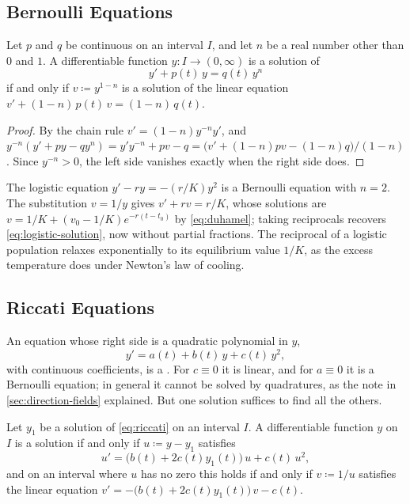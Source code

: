 \subsection{Bernoulli Equations}

\begin{proposition}
\label{prop:bernoulli}
Let $p$ and $q$ be continuous on an interval $I$, and let $n$ be a real number other than $0$ and $1$. A differentiable function $y\colon I\to(0,\infty)$ is a solution of
\[
y'+p(t)\,y=q(t)\,y^n
\]
if and only if $v\coloneqq y^{1-n}$ is a solution of the linear equation $v'+(1-n)\,p(t)\,v=(1-n)\,q(t)$.
\end{proposition}

\begin{proof}
By the chain rule $v'=(1-n)y^{-n}y'$, and $y^{-n}(y'+py-qy^n)=y'y^{-n}+pv-q=\bigl(v'+(1-n)pv-(1-n)q\bigr)/(1-n)$. Since $y^{-n}>0$, the left side vanishes exactly when the right side does.
\end{proof}

The logistic equation $y'-ry=-(r/K)y^2$ is a Bernoulli equation with $n=2$. The substitution $v=1/y$ gives $v'+rv=r/K$, whose solutions are $v=1/K+(v_0-1/K)e^{-r(t-t_0)}$ by \eqref{eq:duhamel}; taking reciprocals recovers \eqref{eq:logistic-solution}, now without partial fractions. The reciprocal of a logistic population relaxes exponentially to its equilibrium value $1/K$, as the excess temperature does under Newton's law of cooling.

\subsection{Riccati Equations}

An equation whose right side is a quadratic polynomial in $y$,
\begin{equation}
y'=a(t)+b(t)\,y+c(t)\,y^2 ,
\label{eq:riccati}
\end{equation}
with continuous coefficients, is a . For $c\equiv0$ it is linear, and for $a\equiv0$ it is a Bernoulli equation; in general it cannot be solved by quadratures, as the note in \cref{sec:direction-fields} explained. But one solution suffices to find all the others.

\begin{proposition}
\label{prop:riccati}
Let $y_1$ be a solution of \eqref{eq:riccati} on an interval $I$. A differentiable function $y$ on $I$ is a solution if and only if $u\coloneqq y-y_1$ satisfies
\[
u'=\bigl(b(t)+2c(t)y_1(t)\bigr)\,u+c(t)\,u^2 ,
\]
and on an interval where $u$ has no zero this holds if and only if $v\coloneqq1/u$ satisfies the linear equation $v'=-\bigl(b(t)+2c(t)y_1(t)\bigr)\,v-c(t)$.
\end{proposition}


